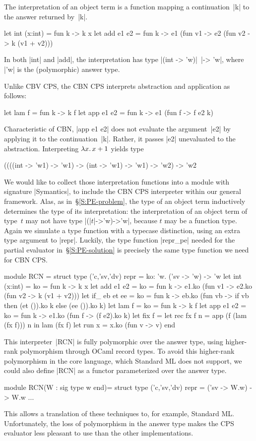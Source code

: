 The interpretation of an object term is a function
mapping a continuation~|k| to the answer
returned by~|k|.
\begin{code}
let int (x:int) = fun k -> k x
let add e1 e2 = fun k -> e1 (fun v1 -> e2 (fun v2 -> k (v1 + v2)))
\end{code}
In both |int| and |add|, the interpretation has type 
|(int -> 'w)|\texttt{ }|-> 'w|, where |'w| is the (polymorphic) answer type.

Unlike CBV CPS, the CBN CPS interprets
abstraction and application as follows:
\begin{code}
let lam f = fun k -> k f
let app e1 e2 = fun k -> e1 (fun f -> f e2 k)
\end{code}
Characteristic of CBN, |app e1 e2|
does not evaluate the argument~|e2| by applying it to the
continuation~|k|. Rather, it passes |e2| unevaluated to the abstraction.
Interpreting $\mathopen{\lambda\mathord{x}.\,} x+1$ yields type
\begin{code}
((((int -> 'w1) -> 'w1) -> (int -> 'w1) -> 'w1) -> 'w2) -> 'w2
\end{code}

We would like to collect those interpretation functions into a module
with signature |Symantics|, to include the CBN CPS interpreter within our
general framework. Alas, as in~\S\ref{S:PE-problem}, the type of
an object term inductively determines the type of its interpretation:
the interpretation of an object term of type~$t$ may not have type
|(|$t$|->'w)->'w|, because $t$ may be a function type.  Again we
simulate a type function with a typecase distinction, using an extra
type argument to |repr|. Luckily, the type function |repr_pe| needed for
the partial evaluator 
in~\S\ref{S:PE-solution} is precisely the same type function we
need for CBN CPS\@.
\begin{code}
module RCN = struct
  type ('c,'sv,'dv) repr = {ko: 'w. ('sv -> 'w) -> 'w}
  let int (x:int) = {ko = fun k -> k x}
  let add e1 e2 = {ko = fun k ->
      e1.ko (fun v1 -> e2.ko (fun v2 -> k (v1 + v2)))}
  let if_ eb et ee = {ko = fun k ->
      eb.ko (fun vb -> if vb then (et ()).ko k else (ee ()).ko k)}
  let lam f = {ko = fun k -> k f}
  let app e1 e2 = {ko = fun k -> e1.ko (fun f -> (f e2).ko k)}
  let fix f = let rec fx f n = app (f (lam (fx f))) n in lam (fx f)
  let run x = x.ko (fun v -> v)
end
\end{code}

This interpreter~|RCN| is fully polymorphic over the answer type,
using higher-rank polymorphism through OCaml record types.
To avoid this higher-rank polymorphism in the core language, which
Standard ML does not support, we could also define |RCN| as
a functor parameterized over
the answer type.
\begin{code}
module RCN(W : sig type w end)= struct
  type ('c,'sv,'dv) repr = ('sv -> W.w) -> W.w
  ...
\end{code}
This allows a translation of these techniques to, for example, Standard ML\@.
Unfortunately, the loss of polymorphism in the answer type makes the 
CPS evaluator less pleasant to use than the other implementations.

